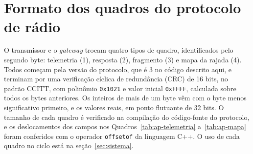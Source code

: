 \chapter{Formato dos quadros do protocolo de rádio}\label{ap:protocolo}

O transmissor e o \textit{gateway} trocam quatro tipos de quadro, identificados pelo segundo byte: telemetria (1), resposta (2), fragmento (3) e mapa da rajada (4). Todos começam pela versão do protocolo, que é 3 no código descrito aqui, e terminam por uma verificação cíclica de redundância (CRC) de 16 bits, no padrão CCITT, com polinômio \texttt{0x1021} e valor inicial \texttt{0xFFFF}, calculada sobre todos os bytes anteriores. Os inteiros de mais de um byte vêm com o byte menos significativo primeiro, e os valores reais, em ponto flutuante de 32 bits. O tamanho de cada quadro é verificado na compilação do código-fonte do protocolo, e os deslocamentos dos campos nos Quadros~\ref{tab:ap-telemetria} a~\ref{tab:ap-mapa} foram conferidos com o operador \texttt{offsetof} da linguagem C++. O uso de cada quadro no ciclo está na seção~\ref{sec:sistema}.

